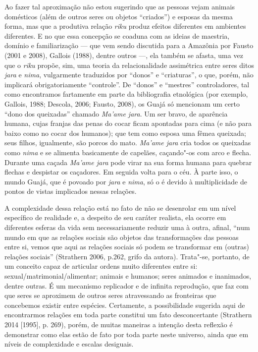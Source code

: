 Ao fazer tal aproximação não estou sugerindo que as pessoas vejam
animais domésticos (além de outros seres ou objetos ``criados'') e esposas
da mesma forma, mas que a produtiva relação \emph{riku} produz efeitos
diferentes em ambientes diferentes. E no que essa concepção se coaduna
com as ideias de maestria, domínio e familiarização --- que vem sendo
discutida para a Amazônia por Fausto (2001 e 2008), Gallois (1988),
dentre outros ---, ela também se afasta, uma vez que o \emph{riku} propõe,
sim, uma teoria da relacionalidade assimétrica entre seres ditos
\emph{jara} e \emph{nima}, vulgarmente traduzidos por ``donos'' e
``criaturas'', o que, porém, não implicará obrigatoriamente ``controle''. De
``donos'' e ``mestres'' controladores, tal como encontramos fartamente em
parte da bibliografia etnológica (por exemplo, Gallois, 1988; Descola,
2006; Fausto, 2008), os Guajá só mencionam um certo ``dono dos queixadas''
chamado \emph{Ma'ame jara}. Um ser bravo, de aparência humana, cujas
franjas das penas do cocar ficam apontadas para cima (e não para baixo
como no cocar dos humanos); que tem como esposa uma fêmea queixada; seus
filhos, igualmente, são porcos do mato. \emph{Ma'ame jara} cria todos os
queixadas como \emph{nima} e se alimenta basicamente de capelães,
caçando"-os com arco e flecha. Durante uma caçada \emph{Ma'ame jara} pode
virar na sua forma humana para quebrar flechas e despistar os caçadores.
Em seguida volta para o céu. À parte isso, o mundo Guajá, que é povoado
por \emph{jara} e \emph{nima}, só o é devido à multiplicidade de pontos
de vistas implicados nessas relações.

A complexidade dessa relação está no fato de não se desenrolar em um
nível específico de realidade e, a despeito de seu caráter realista, ela
ocorre em diferentes esferas da vida sem necessariamente reduzir uma à
outra, afinal, ``num mundo em que as relações sociais são objetos das
transformações das pessoas entre si, vemos que aqui as relações sociais
só podem se transformar em (outras) relações sociais'' (Strathern 2006,
p.262, grifo da autora). Trata"-se, portanto, de um conceito capaz de
articular ordens muito diferentes entre si:
sexual/matrimonial/alimentar; animais e humanos; seres animados e
inanimados, dentre outras. É um mecanismo replicador e de infinita
reprodução, que faz com que seres se aproximem de outros seres
atravessando as fronteiras que concebemos existir entre espécies.
Certamente, a possibilidade sugerida aqui de encontrarmos relações em
toda parte constitui um fato desconcertante (Strathern 2014 [1995],
p. 269), porém, de muitas maneiras a intenção desta reflexão é demonstrar
como elas estão de fato por toda parte neste universo, ainda que em
níveis de complexidade e escalas desiguais.

